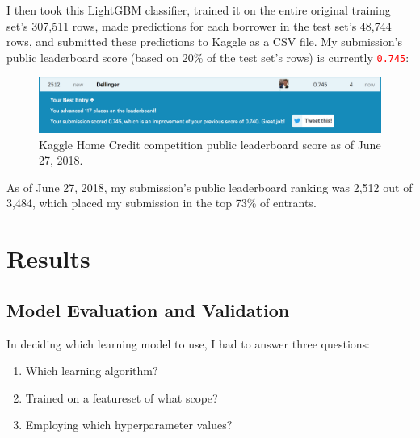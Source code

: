 \documentclass[12pt, letterpaper]{article}
\begin{document}
I then took this LightGBM classifier, trained it on the entire original training set's 307,511 rows, made predictions for each borrower in the test set's 48,744 rows, and submitted these predictions to Kaggle as a CSV file. My submission's public leaderboard score (based on 20\% of the test set's rows) is currently \colorbox{backcolor}{\textcolor{red}{\texttt{0.745}}}:

\begin{figure}[ht]
\includegraphics[width=\textwidth]{kaggle-submission-LightGBM-full-featureset}
\centering
\caption{Kaggle Home Credit competition public leaderboard score as of June 27, 2018.}
\end{figure}

As of June 27, 2018, my submission's public leaderboard ranking was 2,512 out of 3,484, which placed my submission in the top 73\% of entrants.

\section{Results}
\subsection{Model Evaluation and Validation}
In deciding which learning model to use, I had to answer three questions:
\begin{enumerate}
  \item Which learning algorithm?
  \item Trained on a featureset of what scope?
  \item Employing which hyperparameter values?
\end{enumerate}
\end{document}
